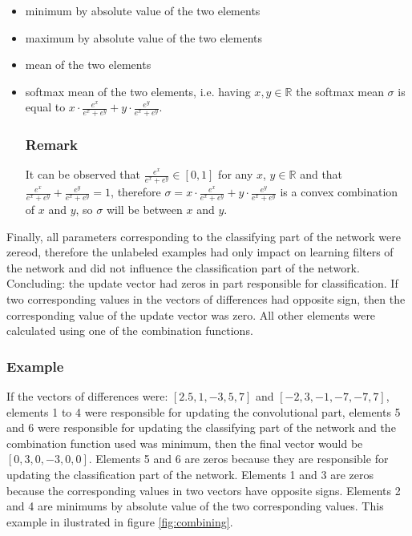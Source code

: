 \documentclass[a4paper,10pt]{report}
\begin{document}
      \begin{itemize}
       \item minimum by absolute value of the two elements
       \item maximum by absolute value of the two elements
       \item mean of the two elements
       \item softmax mean of the two elements, i.e. having $x, y \in \mathbb{R}$ the softmax mean $\sigma$ is equal to $x \cdot \frac{e^x}{e^x + e^y} + y \cdot \frac{e^y}{e^x + e^y}$.
       
       \subsubsection{Remark}
       It can be observed that $\frac{e^x}{e^x + e^y} \in [0, 1]$ for any $x$, $y \in \mathbb{R}$ and that $\frac{e^x}{e^x + e^y} + \frac{e^y}{e^x + e^y} = 1$, therefore $\sigma = x \cdot \frac{e^x}{e^x + e^y} + y \cdot \frac{e^y}{e^x + e^y}$ is a convex combination of $x$ and $y$, so $\sigma$ will be between $x$ and $y$.\\
      \end{itemize}
      
      Finally, all parameters corresponding to the classifying part of the network were zereod, therefore the unlabeled examples had only impact on learning filters of the network and did not influence the classification part of the network.\\
	
      Concluding: the update vector had zeros in part responsible for classification. If two corresponding values in the vectors of differences had opposite sign, then the corresponding value of the update vector was zero. All other elements were calculated using one of the combination functions.\\
      
      \subsubsection{Example}
      If the vectors of differences were: $[2.5, 1, -3, 5, 7]$ and $[-2, 3, -1, -7, -7, 7]$, elements 1 to 4 were responsible for updating the convolutional part, elements 5 and 6 were responsible for updating the classifying part of the network and the combination function used was minimum, then the final vector would be $[0, 3, 0, -3, 0, 0]$. Elements 5 and 6 are zeros because they are responsible for updating the classification part of the network. Elements 1 and 3 are zeros because the corresponding values in two vectors have opposite signs. Elements 2 and 4 are minimums by absolute value of the two corresponding values. This example in ilustrated in figure \ref{fig:combining}.\\
      
\end{document}
